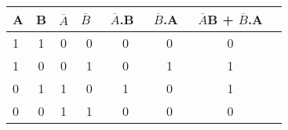 \documentclass{article}
\begin{document}
\begin{table}[h!]
	\begin{center}
		\begin{tabular}{|l|c|c|c|c|c|c|c|}
			\cellcolor{blue!35}\textbf{A} & \cellcolor{blue!35}\textbf{B} & \cellcolor{blue!35}\textbf{$\overline{A}$} & \cellcolor{blue!35}\textbf{$\overline{B}$}\ &
			\cellcolor{blue!35}\textbf{$\overline{A}$.B}\ &
			\cellcolor{blue!35}\textbf{$\overline{B}$.A}\ & 
			\cellcolor{blue!35}\textbf{$\overline{A}$B + $\overline{B}$.A}\\
			
			\hline
			\cellcolor{blue!15}	1 & \cellcolor{blue!15}1 & \cellcolor{blue!15}0 & \cellcolor{blue!15}0 & \cellcolor{blue!15}0 & \cellcolor{blue!15}0 & \cellcolor{blue!15}0\\
			\cellcolor{blue!15}	1 & \cellcolor{blue!15} 0 & \cellcolor{blue!15}0 & \cellcolor{blue!15}1 & \cellcolor{blue!15}0 & \cellcolor{blue!15}1 & \cellcolor{blue!15}1\\
			\cellcolor{blue!15}	0 & \cellcolor{blue!15}1 & \cellcolor{blue!15}1 & 	\cellcolor{blue!15}0 & \cellcolor{blue!15}1 & \cellcolor{blue!15}0 & \cellcolor{blue!15}1\\
			\cellcolor{blue!15}	0 & \cellcolor{blue!15}0 & \cellcolor{blue!15}1 & 	\cellcolor{blue!15}1 & \cellcolor{blue!15}0 & \cellcolor{blue!15}0 & \cellcolor{blue!15}0\\
			\hline	
		\end{tabular}
	\end{center}
\end{table}
\end{document}
